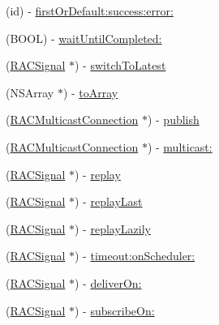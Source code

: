 \begin{DoxyCompactItemize}
\item 
(id) -\/ \mbox{\hyperlink{category_r_a_c_signal_07_operations_08_a12b765a16842e9c7aa1d13b00d8df09b}{first\+Or\+Default\+:success\+:error\+:}}
\item 
(B\+O\+OL) -\/ \mbox{\hyperlink{category_r_a_c_signal_07_operations_08_af4c476fc335ca830841bd4fd267f05ce}{wait\+Until\+Completed\+:}}
\item 
(\mbox{\hyperlink{interface_r_a_c_signal}{R\+A\+C\+Signal}} $\ast$) -\/ \mbox{\hyperlink{category_r_a_c_signal_07_operations_08_a0a6780c4580e1a5338a9a891f7c69ea1}{switch\+To\+Latest}}
\item 
(N\+S\+Array $\ast$) -\/ \mbox{\hyperlink{category_r_a_c_signal_07_operations_08_a5b7a649ea4635f423b73cd4924652fe5}{to\+Array}}
\item 
(\mbox{\hyperlink{interface_r_a_c_multicast_connection}{R\+A\+C\+Multicast\+Connection}} $\ast$) -\/ \mbox{\hyperlink{category_r_a_c_signal_07_operations_08_a16f260eea2cfd9a3953b95926d442a93}{publish}}
\item 
(\mbox{\hyperlink{interface_r_a_c_multicast_connection}{R\+A\+C\+Multicast\+Connection}} $\ast$) -\/ \mbox{\hyperlink{category_r_a_c_signal_07_operations_08_a55b43f4fbef7e430a4587ce13eab18cb}{multicast\+:}}
\item 
(\mbox{\hyperlink{interface_r_a_c_signal}{R\+A\+C\+Signal}} $\ast$) -\/ \mbox{\hyperlink{category_r_a_c_signal_07_operations_08_a6d7d83297f6b837dd5efc18c38483a94}{replay}}
\item 
(\mbox{\hyperlink{interface_r_a_c_signal}{R\+A\+C\+Signal}} $\ast$) -\/ \mbox{\hyperlink{category_r_a_c_signal_07_operations_08_a1a660e0db48169a1ea54288b196515b1}{replay\+Last}}
\item 
(\mbox{\hyperlink{interface_r_a_c_signal}{R\+A\+C\+Signal}} $\ast$) -\/ \mbox{\hyperlink{category_r_a_c_signal_07_operations_08_aa1a3386d321ec82ceff16d98eaf74d33}{replay\+Lazily}}
\item 
(\mbox{\hyperlink{interface_r_a_c_signal}{R\+A\+C\+Signal}} $\ast$) -\/ \mbox{\hyperlink{category_r_a_c_signal_07_operations_08_a8c5f03f4cc8a132e91a985f3d5ccebc0}{timeout\+:on\+Scheduler\+:}}
\item 
(\mbox{\hyperlink{interface_r_a_c_signal}{R\+A\+C\+Signal}} $\ast$) -\/ \mbox{\hyperlink{category_r_a_c_signal_07_operations_08_a69e4dc1c476da42ed829caed84fbd258}{deliver\+On\+:}}
\item 
(\mbox{\hyperlink{interface_r_a_c_signal}{R\+A\+C\+Signal}} $\ast$) -\/ \mbox{\hyperlink{category_r_a_c_signal_07_operations_08_a6b8db542f7106880577a943cb8e9da90}{subscribe\+On\+:}}

\end{DoxyCompactItemize}
